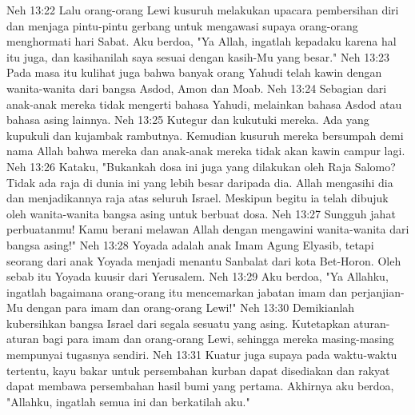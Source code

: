 Neh 13:22  Lalu orang-orang Lewi kusuruh melakukan upacara pembersihan diri dan menjaga pintu-pintu gerbang untuk mengawasi supaya orang-orang menghormati hari Sabat. Aku berdoa, "Ya Allah, ingatlah kepadaku karena hal itu juga, dan kasihanilah saya sesuai dengan kasih-Mu yang besar."
Neh 13:23  Pada masa itu kulihat juga bahwa banyak orang Yahudi telah kawin dengan wanita-wanita dari bangsa Asdod, Amon dan Moab.
Neh 13:24  Sebagian dari anak-anak mereka tidak mengerti bahasa Yahudi, melainkan bahasa Asdod atau bahasa asing lainnya.
Neh 13:25  Kutegur dan kukutuki mereka. Ada yang kupukuli dan kujambak rambutnya. Kemudian kusuruh mereka bersumpah demi nama Allah bahwa mereka dan anak-anak mereka tidak akan kawin campur lagi.
Neh 13:26  Kataku, "Bukankah dosa ini juga yang dilakukan oleh Raja Salomo? Tidak ada raja di dunia ini yang lebih besar daripada dia. Allah mengasihi dia dan menjadikannya raja atas seluruh Israel. Meskipun begitu ia telah dibujuk oleh wanita-wanita bangsa asing untuk berbuat dosa.
Neh 13:27  Sungguh jahat perbuatanmu! Kamu berani melawan Allah dengan mengawini wanita-wanita dari bangsa asing!"
Neh 13:28  Yoyada adalah anak Imam Agung Elyasib, tetapi seorang dari anak Yoyada menjadi menantu Sanbalat dari kota Bet-Horon. Oleh sebab itu Yoyada kuusir dari Yerusalem.
Neh 13:29  Aku berdoa, "Ya Allahku, ingatlah bagaimana orang-orang itu mencemarkan jabatan imam dan perjanjian-Mu dengan para imam dan orang-orang Lewi!"
Neh 13:30  Demikianlah kubersihkan bangsa Israel dari segala sesuatu yang asing. Kutetapkan aturan-aturan bagi para imam dan orang-orang Lewi, sehingga mereka masing-masing mempunyai tugasnya sendiri.
Neh 13:31  Kuatur juga supaya pada waktu-waktu tertentu, kayu bakar untuk persembahan kurban dapat disediakan dan rakyat dapat membawa persembahan hasil bumi yang pertama. Akhirnya aku berdoa, "Allahku, ingatlah semua ini dan berkatilah aku."




